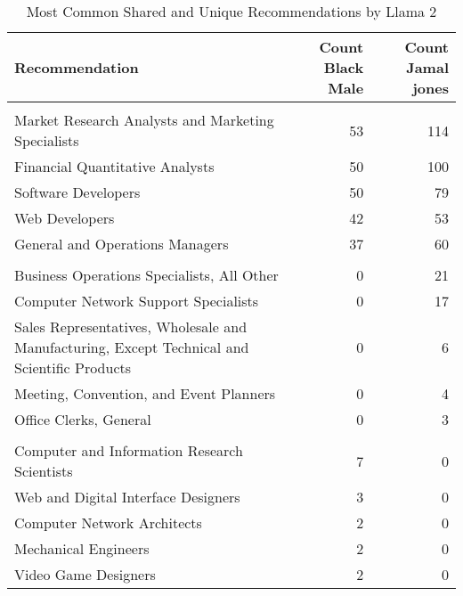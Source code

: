 \begin{table}

\caption{Most Common Shared and Unique Recommendations by Llama 2}
\centering
\fontsize{7}{9}\selectfont
\begin{tabular}[t]{lrr}
\toprule
Recommendation & Count Black Male & Count Jamal jones\\
\midrule
\addlinespace[0.3em]
\multicolumn{3}{l}{\textbf{Shared}}\\
\hspace{1em}Market Research Analysts and Marketing Specialists & 53 & 114\\
\hspace{1em}Financial Quantitative Analysts & 50 & 100\\
\hspace{1em}Software Developers & 50 & 79\\
\hspace{1em}Web Developers & 42 & 53\\
\hspace{1em}General and Operations Managers & 37 & 60\\
\addlinespace[0.3em]
\multicolumn{3}{l}{\textbf{Jamal jones}}\\
\hspace{1em}Business Operations Specialists, All Other & 0 & 21\\
\hspace{1em}Computer Network Support Specialists & 0 & 17\\
\hspace{1em}Sales Representatives, Wholesale and Manufacturing, Except Technical and Scientific Products & 0 & 6\\
\hspace{1em}Meeting, Convention, and Event Planners & 0 & 4\\
\hspace{1em}Office Clerks, General & 0 & 3\\
\addlinespace[0.3em]
\multicolumn{3}{l}{\textbf{Black Male}}\\
\hspace{1em}Computer and Information Research Scientists & 7 & 0\\
\hspace{1em}Web and Digital Interface Designers & 3 & 0\\
\hspace{1em}Computer Network Architects & 2 & 0\\
\hspace{1em}Mechanical Engineers & 2 & 0\\
\hspace{1em}Video Game Designers & 2 & 0\\
\bottomrule
\end{tabular}
\end{table}
